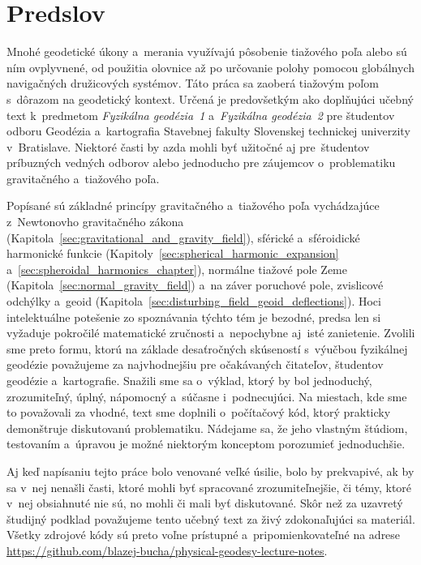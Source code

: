 \documentclass[a4paper,12pt]{book}
\begin{document}

\chapter*{Predslov}

Mnohé geodetické úkony a~merania využívajú pôsobenie tiažového poľa alebo sú 
ním ovplyvnené, od použitia olovnice až po určovanie polohy pomocou globálnych 
navigačných družicových systémov.  Táto práca sa zaoberá tiažovým poľom 
s~dôrazom na geodetický kontext.  Určená je predovšetkým ako doplňujúci učebný 
text k~predmetom \emph{Fyzikálna geodézia~1} a~\emph{Fyzikálna geodézia~2} pre 
študentov odboru Geodézia a~kartografia Stavebnej fakulty Slovenskej technickej 
univerzity v~Bratislave.  Niektoré časti by azda mohli byť užitočné aj 
pre~študentov príbuzných vedných odborov alebo jednoducho pre záujemcov 
o~problematiku gravitačného a~tiažového poľa.

Popísané sú základné princípy gravitačného a~tiažového poľa vychádzajúce 
z~Newtonovho gravitačného zákona 
(Kapitola~\ref{sec:gravitational_and_gravity_field}), sférické a~sféroidické 
harmonické funkcie (Kapitoly~\ref{sec:spherical_harmonic_expansion} 
a~\ref{sec:spheroidal_harmonics_chapter}), normálne tiažové pole Zeme 
(Kapitola~\ref{sec:normal_gravity_field}) a~na záver poruchové pole, zvislicové 
odchýlky a~geoid (Kapitola~\ref{sec:disturbing_field_geoid_deflections}).  Hoci 
intelektuálne potešenie zo spoznávania týchto tém je bezodné, predsa len si 
vyžaduje pokročilé matematické zručnosti a~nepochybne aj~isté zanietenie.  
Zvolili sme preto formu, ktorú na základe desaťročných skúseností s~výučbou 
fyzikálnej geodézie považujeme za najvhodnejšiu pre očakávaných čitateľov, 
študentov geodézie a~kartografie.  Snažili sme sa o~výklad, ktorý by bol 
jednoduchý, zrozumiteľný, úplný, nápomocný a~súčasne i~podnecujúci.  Na 
miestach, kde sme to považovali za vhodné, text sme doplnili o~počítačový kód, 
ktorý prakticky demonštruje diskutovanú problematiku.  Nádejame sa, že jeho 
vlastným štúdiom, testovaním a~úpravou je možné niektorým konceptom porozumieť 
jednoduchšie.

Aj keď napísaniu tejto práce bolo venované veľké úsilie, bolo by prekvapivé, ak 
by sa v~nej nenašli časti, ktoré mohli byť spracované zrozumiteľnejšie, či 
témy, ktoré v~nej obsiahnuté nie sú, no mohli či mali byť diskutované.  Skôr 
než za uzavretý študijný podklad považujeme tento učebný text za živý 
zdokonaľujúci sa materiál.  Všetky zdrojové kódy sú preto voľne prístupné 
a~pripomienkovateľné na adrese 
\url{https://github.com/blazej-bucha/physical-geodesy-lecture-notes}.
\end{document}
